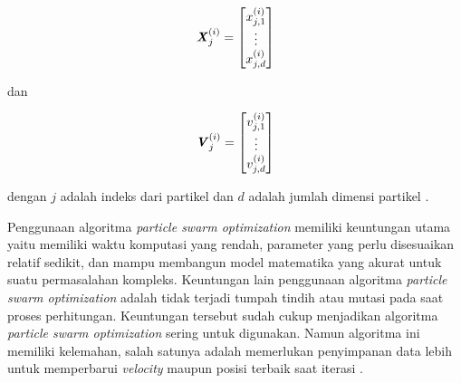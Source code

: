 {{    \begin{equation}
        \textbf{\textit{X}}_{j}^{(i)} = \begin{bmatrix} x_{j,1}^{(i)} \\ \vdots \\ x_{j,d}^{(i)} \end{bmatrix}
        \label{pers: Vektor Posisi}
    \end{equation}

    \noindent
    dan

    \begin{equation}
        \textbf{\textit{V}}_{j}^{(i)} = \begin{bmatrix} v_{j,1}^{(i)} \\ \vdots \\ v_{j,d}^{(i)} \end{bmatrix}
        \label{pers: Vektor Kecepatan}
    \end{equation}

    \noindent
    dengan $j$ adalah indeks dari partikel dan $d$ adalah jumlah dimensi partikel .

    Penggunaan algoritma \textit{particle swarm optimization} memiliki keuntungan utama yaitu memiliki waktu komputasi yang rendah, parameter yang perlu disesuaikan relatif sedikit, dan
    mampu membangun model matematika yang akurat untuk suatu permasalahan kompleks.
    Keuntungan lain penggunaan algoritma \textit{particle swarm optimization} adalah tidak terjadi tumpah tindih atau mutasi pada saat proses perhitungan.
    Keuntungan tersebut sudah cukup menjadikan algoritma \textit{particle swarm optimization} sering untuk digunakan.
    Namun algoritma ini memiliki kelemahan, salah satunya adalah memerlukan penyimpanan data lebih untuk memperbarui \textit{velocity} maupun posisi terbaik saat iterasi .
}

\vspace{-5mm}
}
